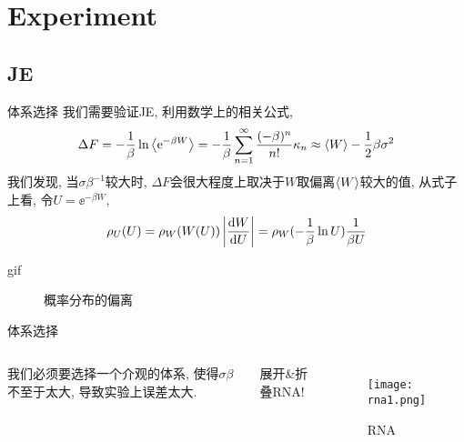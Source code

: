 \section{Experiment}
    \subsection{JE}
    \begin{frame}{体系选择}
        我们需要验证JE, 利用数学上的相关公式,
        \begin{equation}
            \Delta F = -\frac1\beta \ln \expval{\mathrm{e}^{-\beta W}} 
            = -\frac1\beta \sum_{n=1}^\infty \frac{(-\beta)^n}{n!} \kappa_n 
            \approx \expval{W} - \frac12\beta\sigma^2
        \end{equation}
        我们发现, 当$\sigma\beta^{-1}$较大时, $\Delta F$会很大程度上取决于$W$取偏离$\expval{W}$较大的值, 从式子上看, 令$U = \ee^{-\beta W}$,
        \begin{equation}
            \rho_U(U) = \rho_W(W(U)) \left|\dv{W}{U}\right| = \rho_W(-\frac1\beta\ln U) \frac1{\beta U}
        \end{equation}
    \end{frame}
    \begin{frame}{gif}
        \begin{figure}[H]
            \centering
            \caption{概率分布的偏离}
        \end{figure}
    \end{frame}
    \begin{frame}{体系选择}
        \begin{columns}
            我们必须要选择一个介观的体系, 使得$\sigma\beta$不至于太大, 导致实验上误差太大. 
            \pause
            \begin{center}
                {\Large 展开\&折叠RNA!}
            \end{center}
            \begin{figure}
                \centering
                \texttt{[image: rna1.png]}
                \caption{RNA}
            \end{figure}
        \end{columns}
    \end{frame}
